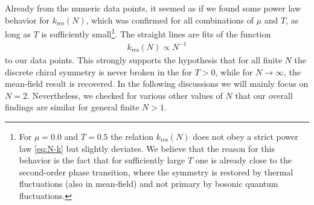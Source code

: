 Already from the numeric data points, it seemed as if we found some power law behavior for $k_\mathrm{res} ( N )$, which was confirmed for all combinations of $\mu$ and $T$, as long as $T$ is sufficiently small\footnote{For $\mu = 0.0$ and $T = 0.5$ the relation $k_\mathrm{res} ( N )$ does not obey a strict power law \eqref{eq:N-k} but slightly deviates. We believe that the reason for this behavior is the fact that for sufficiently large $T$ one is already close to the second-order phase transition, where the \ZII{} symmetry is restored by thermal fluctuations (also in mean-field) and not primary by bosonic quantum fluctuations.}. The straight lines are fits of the function
	\begin{align}
		k_{\mathrm{res}} ( N ) \propto N^{-1}	\label{eq:N-k}
	\end{align}
to our data points. This strongly supports the hypothesis that for all finite $N$ the discrete chiral symmetry is never broken in the \ir{} for $T>0$, while for $N \rightarrow \infty$, the mean-field result is recovered. In the following discussions we will mainly focus on $N = 2$. Nevertheless, we checked for various other values of $N$ that our overall findings are similar for general finite $N > 1$.

